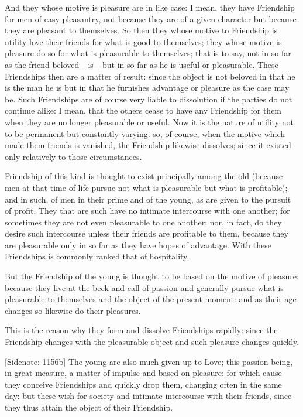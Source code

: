 And they whose motive is pleasure are in like case: I mean, they have
Friendship for men of easy pleasantry, not because they are of a given
character but because they are pleasant to themselves. So then they
whose motive to Friendship is utility love their friends for what is
good to themselves; they whose motive is pleasure do so for what is
pleasurable to themselves; that is to say, not in so far as the friend
beloved _is_ but in so far as he is useful or pleasurable. These
Friendships then are a matter of result: since the object is not beloved
in that he is the man he is but in that he furnishes advantage or
pleasure as the case may be. Such Friendships are of course very liable
to dissolution if the parties do not continue alike: I mean, that the
others cease to have any Friendship for them when they are no longer
pleasurable or useful. Now it is the nature of utility not to be
permanent but constantly varying: so, of course, when the motive which
made them friends is vanished, the Friendship likewise dissolves; since
it existed only relatively to those circumstances.

Friendship of this kind is thought to exist principally among the old
(because men at that time of life pursue not what is pleasurable but
what is profitable); and in such, of men in their prime and of the
young, as are given to the pursuit of profit. They that are such have no
intimate intercourse with one another; for sometimes they are not
even pleasurable to one another; nor, in fact, do they desire such
intercourse unless their friends are profitable to them, because they
are pleasurable only in so far as they have hopes of advantage. With
these Friendships is commonly ranked that of hospitality.

But the Friendship of the young is thought to be based on the motive
of pleasure: because they live at the beck and call of passion and
generally pursue what is pleasurable to themselves and the object of the
present moment: and as their age changes so likewise do their pleasures.

This is the reason why they form and dissolve Friendships rapidly: since
the Friendship changes with the pleasurable object and such pleasure
changes quickly.

[Sidenote: 1156b] The young are also much given up to Love; this passion
being, in great measure, a matter of impulse and based on pleasure: for
which cause they conceive Friendships and quickly drop them, changing
often in the same day: but these wish for society and intimate
intercourse with their friends, since they thus attain the object of
their Friendship.

